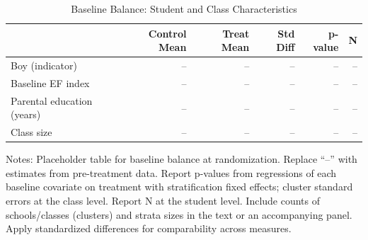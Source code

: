 \begin{table}[p]
\centering
\caption{Baseline Balance: Student and Class Characteristics}
\label{tab:baseline}
\begin{threeparttable}
\begin{tabular}{lrrrrr}
\toprule
 & Control Mean & Treat Mean & Std Diff & p-value & N \\
\midrule
Boy (indicator) & -- & -- & -- & -- & -- \\
Baseline EF index & -- & -- & -- & -- & -- \\
Parental education (years) & -- & -- & -- & -- & -- \\
Class size & -- & -- & -- & -- & -- \\
\bottomrule
\end{tabular}
\begin{tablenotes}[flushleft]
\footnotesize
\item Notes: Placeholder table for baseline balance at randomization. Replace “--” with estimates from pre-treatment data. Report p-values from regressions of each baseline covariate on treatment with stratification fixed effects; cluster standard errors at the class level. Report N at the student level. Include counts of schools/classes (clusters) and strata sizes in the text or an accompanying panel. Apply standardized differences for comparability across measures.
\end{tablenotes}
\end{threeparttable}
\end{table}
